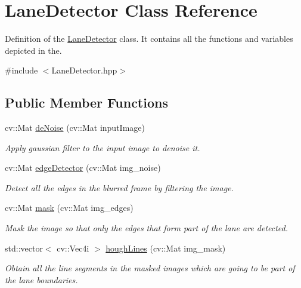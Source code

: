 \hypertarget{classLaneDetector}{}\section{Lane\+Detector Class Reference}
\label{classLaneDetector}


Definition of the \hyperlink{classLaneDetector}{Lane\+Detector} class. It contains all the functions and variables depicted in the.  




{\ttfamily \#include $<$Lane\+Detector.\+hpp$>$}

\subsection*{Public Member Functions}
\begin{DoxyCompactItemize}
\item 
cv\+::\+Mat \hyperlink{classLaneDetector_a816d7555c6b7690d7afdd81eb62dd35b}{de\+Noise} (cv\+::\+Mat input\+Image)
\begin{DoxyCompactList}\small\item\em Apply gaussian filter to the input image to denoise it. \end{DoxyCompactList}\item 
cv\+::\+Mat \hyperlink{classLaneDetector_a8920b291267aad638f8874512fba33cf}{edge\+Detector} (cv\+::\+Mat img\+\_\+noise)
\begin{DoxyCompactList}\small\item\em Detect all the edges in the blurred frame by filtering the image. \end{DoxyCompactList}\item 
cv\+::\+Mat \hyperlink{classLaneDetector_a64d74d2971d1e14175ef58dfbb391f6d}{mask} (cv\+::\+Mat img\+\_\+edges)
\begin{DoxyCompactList}\small\item\em Mask the image so that only the edges that form part of the lane are detected. \end{DoxyCompactList}\item 
std\+::vector$<$ cv\+::\+Vec4i $>$ \hyperlink{classLaneDetector_adbbc2f50aee10844aeec12b1fe084fb2}{hough\+Lines} (cv\+::\+Mat img\+\_\+mask)
\begin{DoxyCompactList}\small\item\em Obtain all the line segments in the masked images which are going to be part of the lane boundaries. \end{DoxyCompactList}\item 

\end{DoxyCompactItemize}
